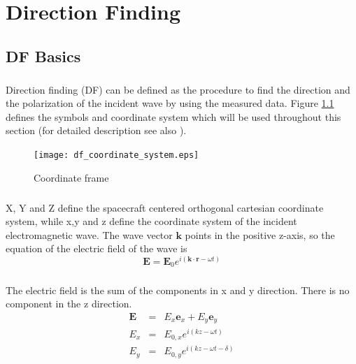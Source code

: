 \documentclass[a4paper,10pt]{thesis}
\begin{document}
\chapter{\textbf{Direction Finding}}
\section{\textbf{DF Basics}}
\paragraph*{}
Direction finding (DF) can be defined as the procedure to find the direction and the polarization of the incident wave by using the measured data. Figure \ref{fig_coordinate_frame_DF} defines the symbols and coordinate system which will be used throughout this section (for detailed description see also
\cite{ladreiter_03}).\\

\begin{figure}
  \texttt{[image: df\_coordinate\_system.eps]}\\
  \caption{Coordinate frame}\label{fig_coordinate_frame_DF}
\end{figure}

\paragraph*{}
X, Y and Z define the spacecraft centered orthogonal cartesian coordinate system, while x,y and z define the coordinate system of the incident electromagnetic wave. The wave vector $\textbf{k}$ points in the positive z-axis, so the equation of the electric field of the wave is
\begin{equation}
\textbf{E}=\textbf{E}_0 e^{i(\textbf{k} \cdot \textbf{r} - \omega t)}
\end{equation}

\paragraph*{}
The electric field is the sum of the components in x and y direction. There is no component in the z direction.
\begin{eqnarray}
\textbf{E}&=&E_x\textbf{e}_x + E_y\textbf{e}_y\\
E_x&=&E_{0,x} e^{i(kz - \omega t)} \label{Ex} \\
E_y&=&E_{0,y} e^{i(kz - \omega t - \delta)} \label{Ey}
\end{eqnarray}
\end{document}
